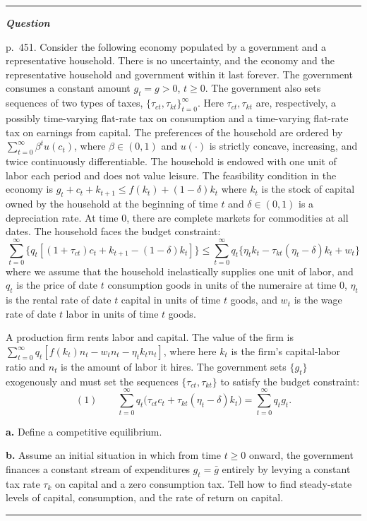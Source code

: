 \documentclass[12pt, letterpaper]{article}
\newenvironment{longquestion}{\par\small\noindent\textcolor{gray!60}{\rule{\linewidth}{0.4pt}}\par\nobreak
  \noindent\textcolor{gray!60!black}{\bfseries\textit{Question}}\par\nobreak}{\par\noindent
  \textcolor{gray!60}{\rule{\linewidth}{0.4pt}}\par}
\begin{document}
\begin{tcolorbox}[evenbox,title={Exercise 11.2 \quad Tax reform: II}]
\begin{longquestion}
p.~451. Consider the following economy populated by a government and a representative household. There is no
uncertainty, and the economy and the representative household and government within it last forever. The government
consumes a constant amount $g_t=g>0$, $t\ge0$. The government also sets sequences of two types of taxes,
$\{\tau_{ct},\tau_{kt}\}_{t=0}^\infty$. Here $\tau_{ct},\tau_{kt}$ are, respectively, a possibly time-varying flat-rate tax
on consumption and a time-varying flat-rate tax on earnings from capital. The preferences of the household are ordered by
$\sum_{t=0}^\infty\beta^tu(c_t)$, where $\beta\in(0,1)$ and $u(\cdot)$ is strictly concave, increasing, and twice
continuously differentiable. The household is endowed with one unit of labor each period and does not value leisure. The
feasibility condition in the economy is $g_t+c_t+k_{t+1}\le f(k_t)+(1-\delta)k_t$ where $k_t$ is the stock of capital
owned by the household at the beginning of time $t$ and $\delta\in(0,1)$ is a depreciation rate. At time 0, there are
complete markets for commodities at all dates. The household faces the budget constraint:
\[
\sum_{t=0}^\infty\{q_t[(1+\tau_{ct})c_t+k_{t+1}-(1-\delta)k_t]\}\le\sum_{t=0}^\infty q_t\{\eta_tk_t-\tau_{kt}(\eta_t-\delta)k_t+w_t\}
\]
where we assume that the household inelastically supplies one unit of labor, and $q_t$ is the price of date $t$
consumption goods in units of the numeraire at time 0, $\eta_t$ is the rental rate of date $t$ capital in units of time
$t$ goods, and $w_t$ is the wage rate of date $t$ labor in units of time $t$ goods.

A production firm rents labor and capital. The value of the firm is $\sum_{t=0}^\infty q_t[f(k_t)n_t-w_tn_t-\eta_tk_tn_t]$,
where here $k_t$ is the firm's capital-labor ratio and $n_t$ is the amount of labor it hires. The government sets
$\{g_t\}$ exogenously and must set the sequences $\{\tau_{ct},\tau_{kt}\}$ to satisfy the budget constraint:
\[
(1)\qquad\sum_{t=0}^\infty q_t\big(\tau_{ct}c_t+\tau_{kt}(\eta_t-\delta)k_t\big)=\sum_{t=0}^\infty q_tg_t.
\]

\textbf{a.} Define a competitive equilibrium.

\textbf{b.} Assume an initial situation in which from time $t\ge0$ onward, the government finances a constant stream of
expenditures $g_t=\bar g$ entirely by levying a constant tax rate $\tau_k$ on capital and a zero consumption tax. Tell how
to find steady-state levels of capital, consumption, and the rate of return on capital.


\end{longquestion}
\end{tcolorbox}
\end{document}
